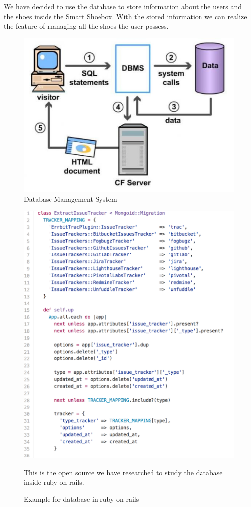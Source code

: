 \documentclass[conference]{IEEEtran}
\begin{document}
We have decided to use the database to store information about the users and the shoes inside the Smart Shoebox. With the stored information we can realize the feature of managing all the shoes the user possess.
\begin{figure}[H]
\begin{center}
    \includegraphics[scale=0.55]{dbms}
    \caption{Database Management System}\label{fig:label}
\end{center}
\end{figure}
\begin{figure}[H]
\begin{center}
    \includegraphics[scale=0.55]{database}
    \caption{Example for database in ruby on rails}\label{fig:label}
    This is the open source we have researched to study the database inside ruby on rails.
\end{center}
\end{figure}
\end{document}
